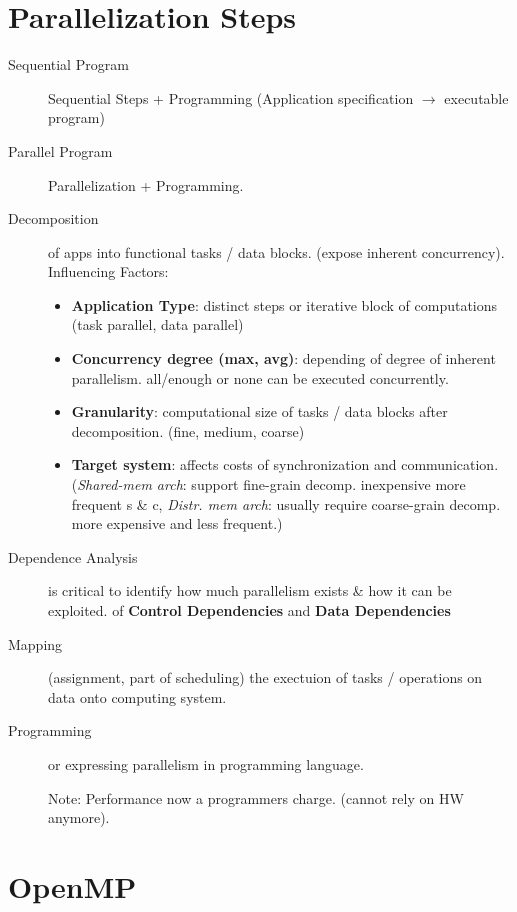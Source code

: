 \section*{Parallelization Steps}
\begin{description}
    \item[Sequential Program]Sequential Steps + Programming (Application specification $\rightarrow$ executable program)
    \item[Parallel Program]Parallelization + Programming. \\ %
        \item[Decomposition] of apps into functional tasks / data blocks. (expose inherent concurrency). Influencing Factors:
        \begin{itemize}
            \item \textbf{Application Type}: distinct steps or iterative block of computations (task parallel, data parallel) %
            \item \textbf{Concurrency degree (max, avg)}: depending of degree of inherent parallelism. all/enough or none can be executed concurrently.
            \item \textbf{Granularity}: computational size of tasks / data blocks after decomposition. (fine, medium, coarse)
            \item \textbf{Target system}: affects costs of synchronization and communication. (\textit{Shared-mem arch}: support fine-grain decomp. inexpensive more frequent s \& c, \textit{Distr. mem arch}: usually require coarse-grain decomp. more expensive and less frequent.)
        \end{itemize}
    \item[Dependence Analysis]is critical to identify how much parallelism exists \& how it can be exploited.
            of \textbf{Control Dependencies} and \textbf{Data Dependencies}
        \item[Mapping] (assignment, part of scheduling) the exectuion of tasks / operations on data onto computing system.
        \item[Programming] or expressing parallelism in programming language.
        \item[] Note: Performance now a programmers charge. (cannot rely on HW anymore).
\end{description}
\section*{OpenMP}
